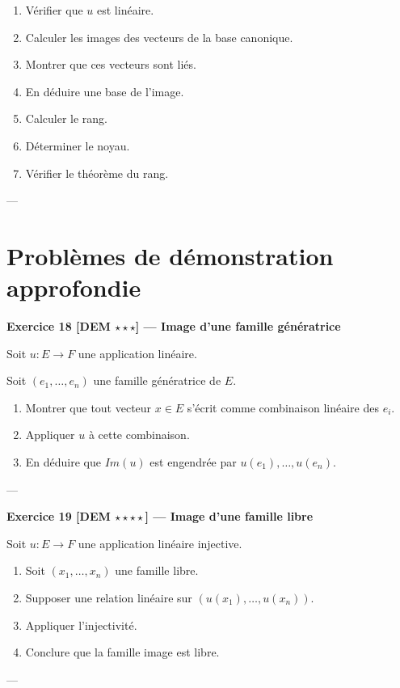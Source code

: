 \documentclass[11pt,a4paper]{article}
\begin{document}
\begin{enumerate}
\item Vérifier que $u$ est linéaire.
\item Calculer les images des vecteurs de la base canonique.
\item Montrer que ces vecteurs sont liés.
\item En déduire une base de l’image.
\item Calculer le rang.
\item Déterminer le noyau.
\item Vérifier le théorème du rang.
\end{enumerate}

---

\section{Problèmes de démonstration approfondie}

\textbf{Exercice 18 [DEM $\star\star\star$] — Image d’une famille génératrice}

Soit $u : E \to F$ une application linéaire.

Soit $(e_1,\dots,e_n)$ une famille génératrice de $E$.

\begin{enumerate}
\item Montrer que tout vecteur $x \in E$ s’écrit comme combinaison linéaire des $e_i$.
\item Appliquer $u$ à cette combinaison.
\item En déduire que $Im(u)$ est engendrée par $u(e_1),\dots,u(e_n)$.
\end{enumerate}

---

\textbf{Exercice 19 [DEM $\star\star\star\star$] — Image d’une famille libre}

Soit $u : E \to F$ une application linéaire injective.

\begin{enumerate}
\item Soit $(x_1,\dots,x_n)$ une famille libre.
\item Supposer une relation linéaire sur $(u(x_1),\dots,u(x_n))$.
\item Appliquer l’injectivité.
\item Conclure que la famille image est libre.
\end{enumerate}

---
\end{document}
